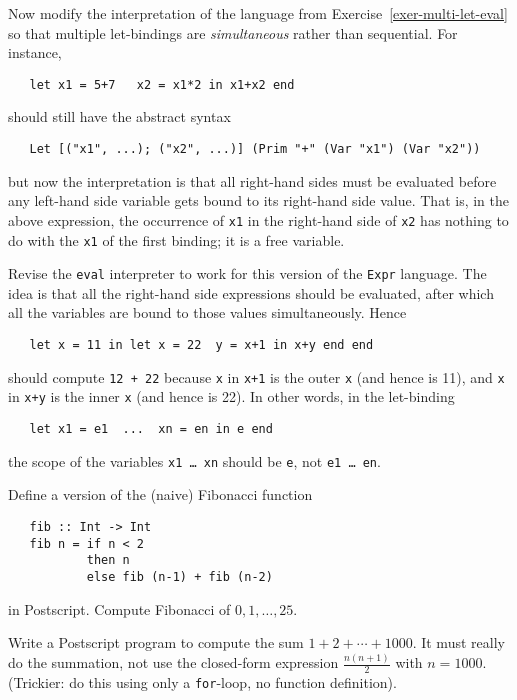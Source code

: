 \documentclass[a4paper]{article}
\begin{document}
\begin{exercise}\label{exer-simultaneous-let}
  
  Now modify the interpretation of the language from
  Exercise~\ref{exer-multi-let-eval} so that multiple let-bindings are
  \emph{simultaneous} rather than sequential.  For instance,

{\codesetup\begin{verbatim}
   let x1 = 5+7   x2 = x1*2 in x1+x2 end
\end{verbatim}}

\noindent
should still have the abstract syntax 

{\codesetup\begin{verbatim}
   Let [("x1", ...); ("x2", ...)] (Prim "+" (Var "x1") (Var "x2"))
\end{verbatim}}

\noindent 
but now the interpretation is that all right-hand sides must be
evaluated before any left-hand side variable gets bound to its
right-hand side value.  That is, in the above expression, the
occurrence of \texttt{x1} in the right-hand side of \texttt{x2} has
nothing to do with the \texttt{x1} of the first binding; it is a free
variable.

Revise the \texttt{eval} interpreter to work for this version of the
\texttt{Expr} language.  The idea is that all the right-hand side
expressions should be evaluated, after which all the variables are
bound to those values simultaneously.  Hence

{\codesetup\begin{verbatim}
   let x = 11 in let x = 22  y = x+1 in x+y end end 
\end{verbatim}}

\noindent 
should compute \texttt{12 + 22} because \texttt{x} in \texttt{x+1} is
the outer \texttt{x} (and hence is 11), and \texttt{x} in \texttt{x+y}
is the inner \texttt{x} (and hence is 22).  In other words, in the
let-binding

{\codesetup\begin{verbatim}
   let x1 = e1  ...  xn = en in e end
\end{verbatim}}

\noindent 
the scope of the variables \texttt{x1 \ldots\ xn} should be
\texttt{e}, not \texttt{e1 \ldots\ en}.  
\end{exercise}


\begin{exercise} 
Define a version of the (naive) Fibonacci function 

{\codesetup\begin{verbatim}
   fib :: Int -> Int
   fib n = if n < 2 
           then n 
           else fib (n-1) + fib (n-2)
\end{verbatim}}

\noindent 
in Postscript\@.  Compute Fibonacci of $0, 1, \ldots, 25$.  
\end{exercise}

\begin{exercise}
  Write a Postscript program to compute the sum $1+2+\cdots+1000$.  It
  must really do the summation, not use the closed-form expression
  $\frac{n(n+1)}{2}$ with $n=1000$.  (Trickier: do this using only a
  \texttt{for}-loop, no function definition).
\end{exercise}
\end{document}
